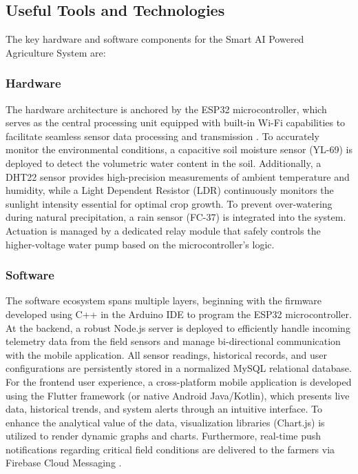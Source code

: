 \subsection{Useful Tools and Technologies}
The key hardware and software components for the Smart AI Powered 
Agriculture System are:

\subsubsection{Hardware}
The hardware architecture is anchored by the ESP32 microcontroller, which serves as the central processing unit equipped with built-in Wi-Fi capabilities to facilitate seamless sensor data processing and transmission \cite{raj2021survey}. To accurately monitor the environmental conditions, a capacitive soil moisture sensor (YL-69) is deployed to detect the volumetric water content in the soil. Additionally, a DHT22 sensor provides high-precision measurements of ambient temperature and humidity, while a Light Dependent Resistor (LDR) continuously monitors the sunlight intensity essential for optimal crop growth. To prevent over-watering during natural precipitation, a rain sensor (FC-37) is integrated into the system. Actuation is managed by a dedicated relay module that safely controls the higher-voltage water pump based on the microcontroller's logic.

\subsubsection{Software}
The software ecosystem spans multiple layers, beginning with the firmware developed using C++ in the Arduino IDE to program the ESP32 microcontroller. At the backend, a robust Node.js server is deployed to efficiently handle incoming telemetry data from the field sensors and manage bi-directional communication with the mobile application. All sensor readings, historical records, and user configurations are persistently stored in a normalized MySQL relational database. For the frontend user experience, a cross-platform mobile application is developed using the Flutter framework (or native Android Java/Kotlin), which presents live data, historical trends, and system alerts through an intuitive interface. To enhance the analytical value of the data, visualization libraries (Chart.js) is utilized to render dynamic graphs and charts. Furthermore, real-time push notifications regarding critical field conditions are delivered to the farmers via Firebase Cloud Messaging \cite{khawas2018firebase}.

